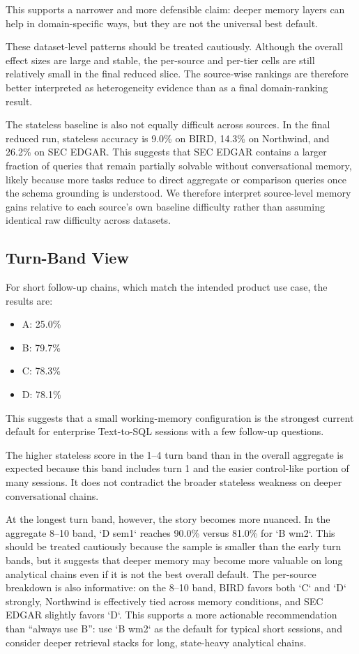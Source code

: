 \documentclass[11pt]{article}
\begin{document}
This supports a narrower and more defensible claim: deeper memory layers can help in domain-specific ways, but they are not the universal best default.

These dataset-level patterns should be treated cautiously. Although the overall effect sizes are large and stable, the per-source and per-tier cells are still relatively small in the final reduced slice. The source-wise rankings are therefore better interpreted as heterogeneity evidence than as a final domain-ranking result.

The stateless baseline is also not equally difficult across sources. In the final reduced run, stateless accuracy is 9.0\% on BIRD, 14.3\% on Northwind, and 26.2\% on SEC EDGAR. This suggests that SEC EDGAR contains a larger fraction of queries that remain partially solvable without conversational memory, likely because more tasks reduce to direct aggregate or comparison queries once the schema grounding is understood. We therefore interpret source-level memory gains relative to each source's own baseline difficulty rather than assuming identical raw difficulty across datasets.

\subsection{Turn-Band View}
For short follow-up chains, which match the intended product use case, the results are:
\begin{itemize}[leftmargin=1.5em]
  \item A: 25.0\%
  \item B: 79.7\%
  \item C: 78.3\%
  \item D: 78.1\%
\end{itemize}

This suggests that a small working-memory configuration is the strongest current default for enterprise Text-to-SQL sessions with a few follow-up questions.

The higher stateless score in the 1--4 turn band than in the overall aggregate is expected because this band includes turn 1 and the easier control-like portion of many sessions. It does not contradict the broader stateless weakness on deeper conversational chains.

At the longest turn band, however, the story becomes more nuanced. In the aggregate 8--10 band, `D sem1` reaches 90.0\% versus 81.0\% for `B wm2`. This should be treated cautiously because the sample is smaller than the early turn bands, but it suggests that deeper memory may become more valuable on long analytical chains even if it is not the best overall default. The per-source breakdown is also informative: on the 8--10 band, BIRD favors both `C` and `D` strongly, Northwind is effectively tied across memory conditions, and SEC EDGAR slightly favors `D`. This supports a more actionable recommendation than ``always use B'': use `B wm2` as the default for typical short sessions, and consider deeper retrieval stacks for long, state-heavy analytical chains.
\end{document}
